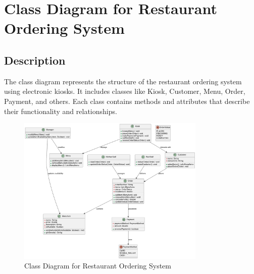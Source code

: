 \documentclass[a4paper,12pt]{article}
\begin{document}
\clearpage

\section{Class Diagram for Restaurant Ordering System}

\subsection*{Description}
The class diagram represents the structure of the restaurant ordering system using electronic kiosks. It includes classes like Kiosk, Customer, Menu, Order, Payment, and others. Each class contains methods and attributes that describe their functionality and relationships.

\begin{figure}[h!]
    \centering
    \includegraphics[width=0.8\textwidth]{task2.png}
    \caption{Class Diagram for Restaurant Ordering System}
\end{figure}
\end{document}
